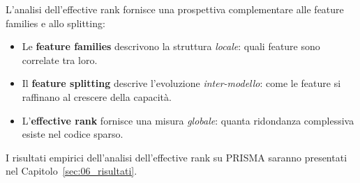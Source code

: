 L'analisi dell'effective rank fornisce una prospettiva complementare alle feature families e allo splitting:
\begin{itemize}
    \item Le \textbf{feature families} descrivono la struttura \textit{locale}: quali feature sono correlate tra loro.
    \item Il \textbf{feature splitting} descrive l'evoluzione \textit{inter-modello}: come le feature si raffinano al crescere della capacità.
    \item L'\textbf{effective rank} fornisce una misura \textit{globale}: quanta ridondanza complessiva esiste nel codice sparso.
\end{itemize}
I risultati empirici dell'analisi dell'effective rank su PRISMA saranno presentati nel Capitolo~\ref{sec:06_risultati}.